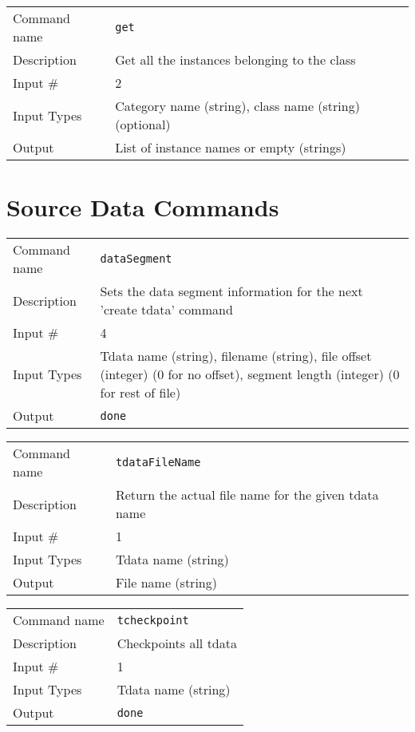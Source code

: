 \bigskip

\noindent
\begin{tabular}{l|p{5in}}
\hline
Command name & {\tt get} \\
Description  & Get all the instances belonging to the class \\
Input \#     & 2 \\
Input Types  & Category name (string), class name (string) (optional) \\
Output       & List of instance names or empty (strings) \\
\hline
\end{tabular}

\section{Source Data Commands}

\noindent
\begin{tabular}{l|p{5in}}
\hline
Command name & {\tt dataSegment} \\
Description  & Sets the data segment information for the next
               'create tdata' command \\
Input \#     & 4 \\
Input Types  & Tdata name (string), filename (string), file offset
               (integer) (0 for no offset), segment length (integer)
               (0 for rest of file) \\
Output       & {\tt done} \\
\hline
\end{tabular}

\bigskip

\noindent
\begin{tabular}{l|p{5in}}
\hline
Command name & {\tt tdataFileName} \\
Description  & Return the actual file name for the given tdata name \\
Input \#     & 1 \\
Input Types  & Tdata name (string) \\
Output       & File name (string) \\
\hline
\end{tabular}

\bigskip

\noindent
\begin{tabular}{l|p{5in}}
\hline
Command name & {\tt tcheckpoint} \\
Description  & Checkpoints all tdata \\
Input \#     & 1 \\
Input Types  & Tdata name (string) \\
Output       & {\tt done} \\
\hline
\end{tabular}

